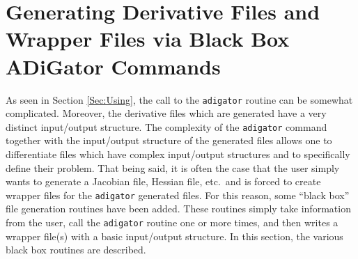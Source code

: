 \documentclass[10pt,pdftex]{article}
\begin{document}
\section{Generating Derivative Files and Wrapper Files via Black Box ADiGator Commands}
As seen in Section \ref{Sec:Using}, the call to the \texttt{adigator} routine can be somewhat complicated. Moreover, the derivative files which are generated have a very distinct input/output structure. The complexity of the \texttt{adigator} command together with the input/output structure of the generated files allows one to differentiate files which have complex input/output structures and to specifically define their problem.
That being said, it is often the case that the user simply wants to generate a Jacobian file, Hessian file, etc.~and is forced to create wrapper files for the \texttt{adigator} generated files.
For this reason, some ``black box'' file generation routines have been added. These routines simply take information from the user, call the \texttt{adigator} routine one or more times, and then writes a wrapper file(s) with a basic input/output structure. In this section, the various black box routines are described.
\end{document}
